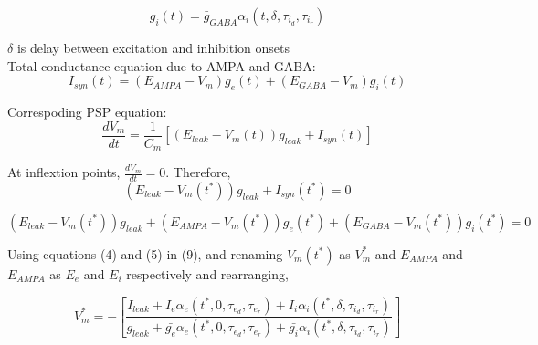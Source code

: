 \documentclass[10pt,a4paper]{article}
\begin{document}
\begin{equation}
g_{i}(t) = \bar{g}_{GABA} \alpha_i (t, \delta, \tau_{i_d}, \tau_{i_r})
\end{equation}

$\delta$ is delay between excitation and inhibition onsets\\

Total conductance equation due to AMPA and GABA:
\begin{equation}
I_{syn}(t) = (E_{AMPA} - V_m)g_{e}(t) + (E_{GABA} - V_m)g_{i}(t)
\end{equation}

Correspoding PSP equation:
\begin{equation}
\frac{dV_m}{dt} = \frac{1}{C_m }[(E_{leak} - V_m(t))g_{leak} + I_{syn}(t)]
\end{equation}

At inflextion points, $ \frac{dV_m}{dt} = 0$. Therefore,
\begin{equation}
(E_{leak} - V_m(t^*))g_{leak} + I_{syn}(t^*) = 0
\end{equation}


\begin{equation}
(E_{leak} - V_m(t^*))g_{leak} + (E_{AMPA} - V_m(t^*))g_{e}(t^*) + (E_{GABA} - V_m(t^*))g_{i}(t^*) = 0
\end{equation}

Using equations (4) and (5) in (9), and renaming $V_m(t^*)$ as $V^*_m$ and $E_{AMPA}$ and $E_{AMPA}$ as $E_e$ and $E_i$ respectively and rearranging,

\begin{equation}
V^*_m = - \left[ \frac{I_{leak} + \bar{I_e}\alpha_e(t^*,0, \tau_{e_d}, \tau_{e_r}) + \bar{I_i}\alpha_i(t^*,\delta, \tau_{i_d}, \tau_{i_r})}{g_{leak} + \bar{g_e}\alpha_e(t^*,0, \tau_{e_d}, \tau_{e_r}) + \bar{g_i}\alpha_i(t^*,\delta, \tau_{i_d}, \tau_{i_r})} \right]
\end{equation}



\end{document}
